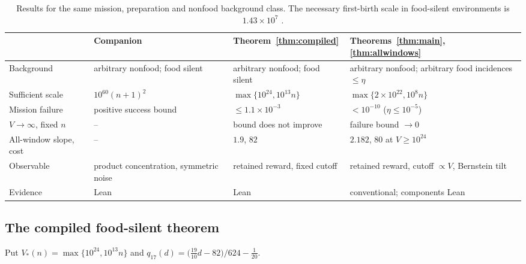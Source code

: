 \documentclass[11pt,letterpaper]{article}
\theoremstyle{plain}
\theoremstyle{definition}
\theoremstyle{remark}
\numberwithin{equation}{section}
\begin{document}
\begin{table}[t]
\centering\small
\begin{tabular}{@{}>{\raggedright\arraybackslash}p{.19\linewidth}>{\raggedright\arraybackslash}p{.22\linewidth}>{\raggedright\arraybackslash}p{.25\linewidth}>{\raggedright\arraybackslash}p{.26\linewidth}@{}}
\toprule
 & Companion \cite{twowindow2026} & Theorem~\ref{thm:compiled} & Theorems~\ref{thm:main}, \ref{thm:allwindows}\\
\midrule
Background & arbitrary nonfood; food silent & arbitrary nonfood; food silent & arbitrary nonfood; arbitrary food incidences $\le\eta$\\
Sufficient scale & $10^{60}(n+1)^2$ & $\max\{10^{24},10^{13}n\}$ & $\max\{2\times10^{22},10^{8}n\}$\\
Mission failure & positive success bound & $\le1.1\times10^{-3}$ & $<10^{-10}$ ($\eta\le10^{-5}$)\\
$V\to\infty$, fixed $n$ & -- & bound does not improve & failure bound $\to0$\\
All-window slope, cost & -- & $1.9$, $82$ & $2.182$, $80$ at $V\ge10^{24}$\\
Observable & product concentration, symmetric noise & retained reward, fixed cutoff & retained reward, cutoff $\propto V$, Bernstein tilt\\
Evidence & Lean & Lean & conventional; components Lean\\
\bottomrule
\end{tabular}
\caption{Results for the same mission, preparation and nonfood background class. The necessary first-birth scale in food-silent environments is $1.43\times10^7$ \cite{twowindow2026}.}
\label{tab:comparison}
\end{table}



\subsection{The compiled food-silent theorem}
Put $V_*(n)=\max\{10^{24},10^{13}n\}$ and $q_{17}(d)=\bigl(\tfrac{19}{10}d-82\bigr)/624-\tfrac1{20}$.
\end{document}
